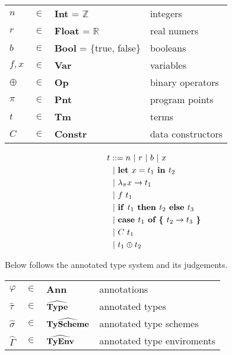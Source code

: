 \documentclass[10pt]{article}
\newcommand{\keyw}[1]{\textrm{\textbf{#1}}}
\newcommand{\GammaH}{\widehat{\Gamma}}
\newcommand{\tauH}{\widehat{\tau}}
\newcommand{\sigmaH}{\widehat{\sigma}}
\newcommand{\letin}[2]{\keyw{let~} #1 \keyw{~in~} #2}
\newcommand{\lam}[2]{\keyw{$\lambda_\pi$} #1 \rightarrow #2} %
\newcommand{\ite}[3]{\keyw{if~} #1 \keyw{~then~} #2 \keyw{~else~} #3}
\newcommand{\case}[3]{\keyw{case~} #1 \keyw{~of \{~} #2 \rightarrow #3 \keyw{~\}}}
\newcommand{\app}[2]{#1 ~ #2}
\newcommand{\con}[2]{#1 ~ #2}
\newcommand{\infix}[2]{#1 \oplus #2}
\begin{document}

\begin{table}[htp]
	\centering
	\begin{tabular}{llll}
		$n$     & $\in$     & \textbf{Int} = $\mathbb{Z}$         & integers\\
		$r$     & $\in$     & \textbf{Float} = $\mathbb{R}$       & real numers\\
		$b$     & $\in$     & \textbf{Bool} = \{true, false\}   & booleans\\
		$f,x$   & $\in$     & \textbf{Var}                      & variables\\
		$\oplus$ & $\in$     & \textbf{Op}                       & binary operators\\
		$\pi$   & $\in$     & \textbf{Pnt}                      & program points\\
		$t$     & $\in$     & \textbf{Tm}                       & terms\\
		$C$     & $\in$     & \textbf{Constr}                   & data constructors\\
	\end{tabular}
\end{table}

\begin{align*}
	t   & ::= n ~|~ r ~|~ b ~|~ x\\
		& ~|~ \letin{x = t_1}{t_2}\\
		& ~|~ \lam{x}{t_1}\\
		& ~|~ \app{f}{t_1}\\
		& ~|~ \ite{t_1}{t_2}{t_3}\\
		& ~|~ \case{t_1}{t_2}{t_3}\\
		& ~|~ \con{C}{t_1}\\
		& ~|~ \infix{t_1}{t_2}\\
\end{align*}

Below follows the annotated type system and its judgements.

\begin{table}[htp]
	\centering
	\begin{tabular}{llll}
		$\varphi$ & $\in$   & \textbf{Ann}                           & annotations\\
		$\tauH$   & $\in$   & $\widehat{\textrm{\textbf{Type}}}$     & annotated types\\
		$\sigmaH$ & $\in$   & $\widehat{\textrm{\textbf{TyScheme}}}$ & annotated type schemes\\
		$\GammaH$ & $\in$   & $\widehat{\textrm{\textbf{TyEnv}}}$    & annotated type enviroments\\
	\end{tabular}
\end{table}
\end{document}
